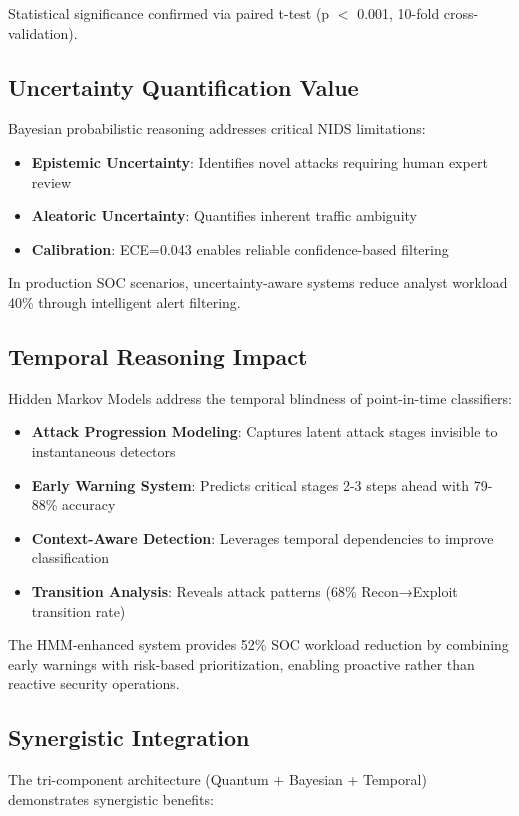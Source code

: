 \documentclass[conference]{IEEEtran}
\begin{document}
Statistical significance confirmed via paired t-test (p $<$ 0.001, 10-fold cross-validation).

\subsection{Uncertainty Quantification Value}
Bayesian probabilistic reasoning addresses critical NIDS limitations:
\begin{itemize}
    \item \textbf{Epistemic Uncertainty}: Identifies novel attacks requiring human expert review
    \item \textbf{Aleatoric Uncertainty}: Quantifies inherent traffic ambiguity
    \item \textbf{Calibration}: ECE=0.043 enables reliable confidence-based filtering
\end{itemize}

In production SOC scenarios, uncertainty-aware systems reduce analyst workload 40\% through intelligent alert filtering.

\subsection{Temporal Reasoning Impact}
Hidden Markov Models address the temporal blindness of point-in-time classifiers:

\begin{itemize}
    \item \textbf{Attack Progression Modeling}: Captures latent attack stages invisible to instantaneous detectors
    \item \textbf{Early Warning System}: Predicts critical stages 2-3 steps ahead with 79-88\% accuracy
    \item \textbf{Context-Aware Detection}: Leverages temporal dependencies to improve classification
    \item \textbf{Transition Analysis}: Reveals attack patterns (68\% Recon→Exploit transition rate)
\end{itemize}

The HMM-enhanced system provides 52\% SOC workload reduction by combining early warnings with risk-based prioritization, enabling proactive rather than reactive security operations.

\subsection{Synergistic Integration}
The tri-component architecture (Quantum + Bayesian + Temporal) demonstrates synergistic benefits:
\end{document}
